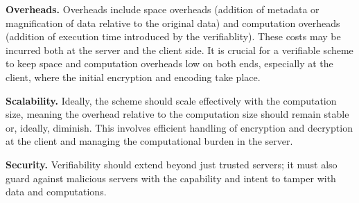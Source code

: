 


\noindent\textbf{Overheads.} 
Overheads include space overheads (addition of metadata or magnification of data relative to the original data) and computation overheads (addition of execution time  introduced by the verifiablity). These costs may be incurred both at the server and the client side. It is crucial for a verifiable scheme to keep space and computation overheads low on both ends, especially at the client, where the initial encryption and encoding take place.

\noindent\textbf{Scalability.} 
Ideally, the scheme should scale effectively with the computation size, meaning the overhead relative to the computation size should remain stable or, ideally, diminish. This involves efficient handling of encryption and decryption at the client and managing the computational burden in the server. 

\noindent\textbf{Security.} 
Verifiability should extend beyond just trusted servers; it must also guard against malicious servers with the capability and intent to tamper with data and computations.


